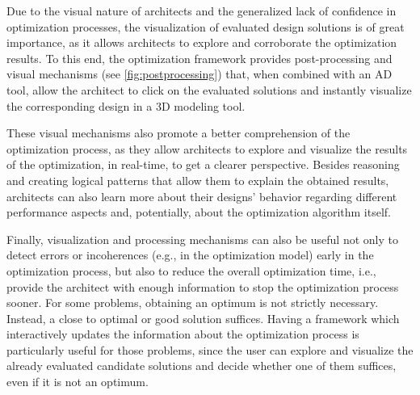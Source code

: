 Due to the visual nature of architects and the generalized lack of confidence in optimization processes, the visualization of evaluated design solutions is of great importance, as it allows architects to explore and corroborate the optimization results. To this end, the optimization framework provides post-processing and visual mechanisms (see \cref{fig:postprocessing}) that, when combined with an \ac{AD} tool, allow the architect to click on the evaluated solutions and instantly visualize the corresponding design in a 3D modeling tool. 

These visual mechanisms also promote a better comprehension of the optimization process, as they allow architects to explore and visualize the results of the optimization, in real-time, to get a clearer perspective. Besides reasoning and creating logical patterns that allow them to explain the obtained results, architects can also learn more about their designs' behavior regarding different performance aspects and, potentially, about the optimization algorithm itself.

Finally, visualization and processing mechanisms can also be useful not only to detect errors or incoherences (e.g., in the optimization model) early in the optimization process, but also to reduce the overall optimization time, i.e.,  provide the architect with enough information to stop the optimization process sooner. For some problems, obtaining an optimum is not strictly necessary. Instead, a close to optimal or good solution suffices. Having a framework which interactively updates the information about the optimization process is particularly useful for those problems, since the user can explore and visualize the already evaluated candidate solutions and decide whether one of them suffices, even if it is not an optimum. 
